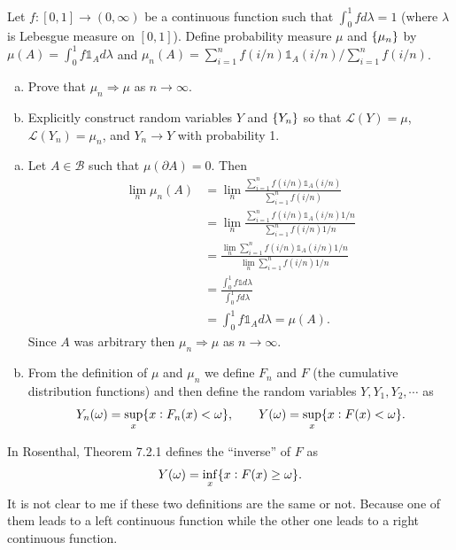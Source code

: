 \begin{problem}
	Let $ f:[0,1]\to (0,\infty) $ be a continuous function such that $ \int_{0}^{1}fd\lambda = 1 $ (where $ \lambda $ is Lebesgue measure on $ [0,1] $). Define probability measure $ \mu $ and $ \{\mu_n\} $ by $ \mu(A) = \int_{0}^{1}f\mathds{1}_A d\lambda $ and $ \mu_n(A) = \sum_{i=1}^{n}f(i/n)\mathds{1}_{A}(i/n)/\sum_{i=1}^{n}f(i/n) $.
	\begin{enumerate}[(a)]
		\item Prove that $ \mu_n \Rightarrow \mu $ as $ n\to\infty $.
		\item Explicitly construct  random variables $ Y $ and $ \{Y_n\} $ so that $ \mathcal{L}(Y)=\mu $, $ \mathcal{L}(Y_n)=\mu_n $, and $ Y_n\to Y $ with probability 1. 
	\end{enumerate}
\end{problem}
\begin{solution}
	\begin{enumerate}[(a)]
		\item Let $ A \in \mathcal{B} $ such that $ \mu(\partial A) = 0 $. Then
		\begin{align*}
			\lim_n \mu_n(A) &= \lim_n \frac{\sum_{i=1}^{n}f(i/n)\mathds{1}_{A}(i/n)}{\sum_{i=1}^{n}f(i/n)} \\
			&= \lim_n \frac{\sum_{i=1}^{n}f(i/n)\mathds{1}_{A}(i/n)1/n}{\sum_{i=1}^{n}f(i/n)1/n} \\
			&= \frac{\lim_n \sum_{i=1}^{n}f(i/n)\mathds{1}_{A}(i/n)1/n}{\lim_n \sum_{i=1}^{n}f(i/n)1/n} \\
			&= \frac{\int_{0}^{1} f \mathds{1} d\lambda}{\int_{0}^{1} f d\lambda} \\
			&= \int_{0}^{1}f\mathds{1}_A d\lambda  = \mu(A).
		\end{align*}
		Since $ A $ was arbitrary then $ \mu_n \Rightarrow \mu $ as $ n\to\infty $.
		
		\item From the definition of $ \mu $ and $ \mu_n $ we define $ F_n $ and $ F $ (the cumulative distribution functions) and then define the random variables $ Y, Y_1,Y_2,\cdots $ as
		\[ Y_n(\omega) = \sup_x\{x: F_n(x)< \omega\},\qquad Y(\omega)= \sup_x \{x: F(x)<\omega\}. \]
	\end{enumerate}
\end{solution}
\begin{remark}
	In Rosenthal, Theorem 7.2.1 defines the ``inverse'' of $ F $ as
	\[ Y(\omega) = \inf_x\{x: F(x)\geq \omega\}. \]
	{\color{red} \noindent  It is not clear to me }if these two definitions are the same or not. Because one of them leads to a left continuous function while the other one leads to a right continuous function.
\end{remark}



